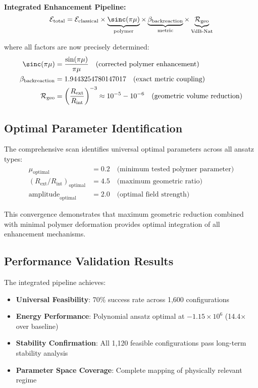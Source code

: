 \documentclass[11pt]{article}
\begin{document}
\textbf{Integrated Enhancement Pipeline:}
\begin{equation}
\mathcal{E}_{\text{total}} = \mathcal{E}_{\text{classical}} \times \underbrace{\sinc(\pi\mu)}_{\text{polymer}} \times \underbrace{\beta_{\text{backreaction}}}_{\text{metric}} \times \underbrace{\mathcal{R}_{\text{geo}}}_{\text{VdB-Nat}}
\end{equation}

where all factors are now precisely determined:
\begin{align}
\sinc(\pi\mu) &= \frac{\sin(\pi\mu)}{\pi\mu} \quad \text{(corrected polymer enhancement)} \\
\beta_{\text{backreaction}} &= 1.9443254780147017 \quad \text{(exact metric coupling)} \\
\mathcal{R}_{\text{geo}} &= \left(\frac{R_{\text{ext}}}{R_{\text{int}}}\right)^{-3} \approx 10^{-5}-10^{-6} \quad \text{(geometric volume reduction)}
\end{align}

\subsection{Optimal Parameter Identification}

The comprehensive scan identifies universal optimal parameters across all ansatz types:
\begin{align}
\mu_{\text{optimal}} &= 0.2 \quad \text{(minimum tested polymer parameter)} \\
(R_{\text{ext}}/R_{\text{int}})_{\text{optimal}} &= 4.5 \quad \text{(maximum geometric ratio)} \\
\text{amplitude}_{\text{optimal}} &= 2.0 \quad \text{(optimal field strength)}
\end{align}

This convergence demonstrates that maximum geometric reduction combined with minimal polymer deformation provides optimal integration of all enhancement mechanisms.

\subsection{Performance Validation Results}

The integrated pipeline achieves:
\begin{itemize}
\item \textbf{Universal Feasibility}: 70\% success rate across 1,600 configurations
\item \textbf{Energy Performance}: Polynomial ansatz optimal at $-1.15 \times 10^6$ (14.4× over baseline)
\item \textbf{Stability Confirmation}: All 1,120 feasible configurations pass long-term stability analysis
\item \textbf{Parameter Space Coverage}: Complete mapping of physically relevant regime
\end{itemize}
\end{document}

